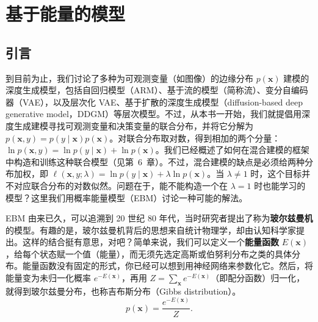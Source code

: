 \chapter{基于能量的模型}
\label{ch:ebm}
\providecommand{\LogSumExp}{\operatorname{LogSumExp}}

\section{引言}
到目前为止，我们讨论了多种为可观测变量（如图像）的边缘分布 $p(\mathbf{x})$ 建模的深度生成模型，包括自回归模型（ARM）、基于流的模型（简称流）、变分自编码器（VAE），以及层次化 VAE、基于扩散的深度生成模型（diffusion-based deep generative model，DDGM）等层次模型。不过，从本书一开始，我们就提倡用深度生成建模寻找可观测变量和决策变量的联合分布，并将它分解为 $p(\mathbf{x},y)=p(y\mid\mathbf{x})p(\mathbf{x})$。对联合分布取对数，得到相加的两个分量：$\ln p(\mathbf{x},y)=\ln p(y\mid\mathbf{x})+\ln p(\mathbf{x})$。我们已经概述了如何在混合建模的框架中构造和训练这种联合模型（见第~6~章）。不过，混合建模的缺点是必须给两种分布加权，即 $\ell(\mathbf{x},y;\lambda)=\ln p(y\mid\mathbf{x})+\lambda\ln p(\mathbf{x})$。当 $\lambda\ne 1$ 时，这个目标并不对应联合分布的对数似然。问题在于，能不能构造一个在 $\lambda=1$ 时也能学习的模型？这里我们用概率能量模型（EBM）讨论一种可能的解法。

EBM 由来已久，可以追溯到 20 世纪 80 年代，当时研究者提出了称为\textbf{玻尔兹曼机}的模型。有趣的是，玻尔兹曼机背后的思想来自统计物理学，却由认知科学家提出。这样的结合挺有意思，对吧？简单来说，我们可以定义一个\textbf{能量函数} $E(\mathbf{x})$，给每个状态赋一个值（能量），而无须先选定高斯或伯努利分布之类的具体分布。能量函数没有固定的形式，你已经可以想到用神经网络来参数化它。然后，将能量变为未归一化概率 $e^{-E(\mathbf{x})}$，再用 $Z=\sum_{\mathbf{x}}e^{-E(\mathbf{x})}$（即配分函数）归一化，就得到玻尔兹曼分布，也称吉布斯分布（Gibbs distribution）。
\begin{equation}
p(\mathbf{x})=\frac{e^{-E(\mathbf{x})}}{Z}.
\tag{7.1}\label{eq:07-01}
\end{equation}

